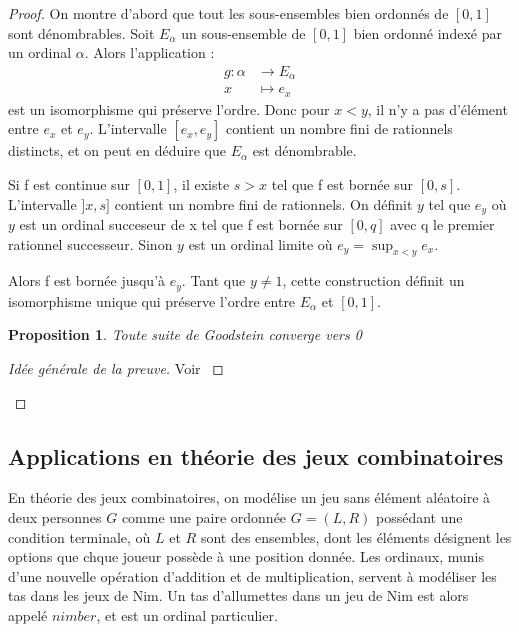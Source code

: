 \documentclass{article}
\theoremstyle{definition}
\theoremstyle{plain}
\newtheorem{proposition}[subsubsection]{Proposition}
\theoremstyle{plain}
\theoremstyle{plain}
\theoremstyle{plain}
\theoremstyle{plain}
\begin{document}
\begin{proof}
	On montre d'abord que tout les sous-ensembles bien ordonnés de \( [0,1] \) sont dénombrables. Soit \( E_{\alpha} \) un sous-ensemble de \( [0,1] \) bien ordonné indexé par un ordinal \( \alpha \). Alors l'application :
\begin{align*}	
	g : \alpha &\rightarrow E_{\alpha} \\
	x &\mapsto e_{x}
\end{align*}
est un isomorphisme qui préserve l'ordre. Donc pour \( x < y \), il n'y a pas d'élément entre \( e_{x} \) et \( e_{y} \). L'intervalle \( [e_{x},e_{y}] \) contient un nombre fini de rationnels distincts, et on peut en déduire que \( E_{\alpha} \) est dénombrable.

Si f est continue sur \( [0,1] \), il existe \( s > x \) tel que f est bornée sur \( [0,s] \). L'intervalle \( ]x,s] \) contient un nombre fini de rationnels. On définit \( y \) tel que \( e_{y} \) où \( y \) est un ordinal succeseur de x tel que f est bornée sur \( [0,q] \) avec q le premier rationnel successeur. Sinon \( y \) est un ordinal limite où \( e_y = \sup_{x<y} e_{x} \). 

Alors f est bornée jusqu'à \( e_{y} \). Tant que \( y \neq 1 \), cette construction définit un isomorphisme unique qui préserve l'ordre entre \( E_{\alpha} \) et \( [0,1] \).

\begin{proposition}
	Toute suite de Goodstein converge vers 0
\end{proposition}

\begin{proof}[Idée générale de la preuve]
	Voir \cite{dehornoy2017théorie}
\end{proof}
\end{proof}

\subsection{Applications en théorie des jeux combinatoires}

\par En théorie des jeux combinatoires, on modélise un jeu sans élément aléatoire à deux personnes \( G \) comme une paire ordonnée \( G=(L,R) \) possédant une condition terminale, où \( L \) et \( R \) sont des ensembles, dont les éléments désignent les options que chque joueur possède à une position donnée. Les ordinaux, munis d'une nouvelle opération d'addition et de multiplication, servent à modéliser les tas dans les jeux de Nim. Un tas d'allumettes dans un jeu de Nim est alors appelé \( nimber \), et est un ordinal particulier. 
\end{document}
